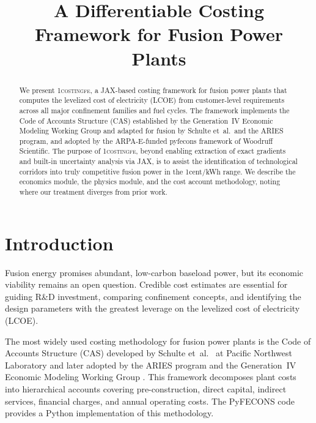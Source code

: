 \documentclass{article}
\title{A Differentiable Costing Framework for Fusion Power Plants}
\begin{document}
\maketitle

\begin{abstract}
We present \textsc{1costingfe}, a JAX-based costing framework for fusion power plants
that computes the levelized cost of electricity (LCOE) from customer-level requirements
across all major confinement families and fuel cycles.
The framework implements the Code of Accounts Structure (CAS)
established by the Generation~IV Economic Modeling Working Group and adapted for fusion
by Schulte et~al.\ and the ARIES program, and adopted by the ARPA-E-funded pyfecons framework
of Woodruff Scientific.
The purpose of \textsc{1costingfe}, beyond enabling extraction of exact gradients and built-in uncertainty analysis via JAX,
is to assist the identification of technological corridors into truly competitive fusion power in the 1cent/kWh range.
We describe the economics module, the physics module, and the cost
account methodology, noting where our treatment diverges from prior
work.
\end{abstract}



\section{Introduction}
\label{sec:intro}

Fusion energy promises abundant, low-carbon baseload power, but its economic
viability remains an open question. Credible cost estimates are essential for
guiding R\&D investment, comparing confinement concepts, and identifying the
design parameters with the greatest leverage on the levelized cost of
electricity (LCOE).

The most widely used costing methodology for fusion power plants is the
Code of Accounts Structure (CAS) developed by Schulte et~al.\
\citep{schulte1978} at Pacific Northwest Laboratory and later adopted by
the ARIES program \citep{miller1998} and the Generation~IV Economic Modeling
Working Group \citep{emwg2007}. This framework decomposes plant costs into
hierarchical accounts covering pre-construction, direct capital, indirect
services, financial charges, and annual operating costs. The PyFECONS
code \citep{woodruff2026, woodruff2026b} provides a Python implementation of this
methodology.
\end{document}
